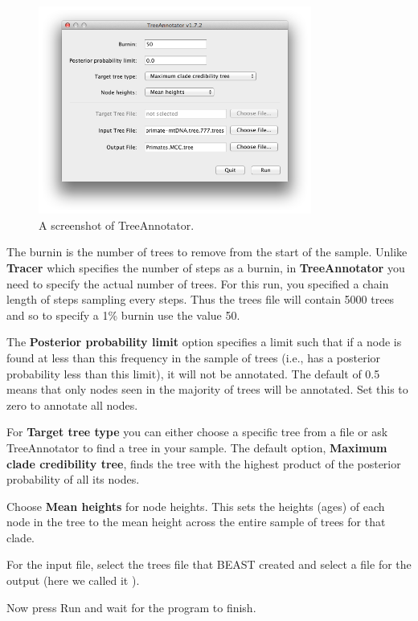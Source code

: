 \documentclass[11pt]{article}
\theoremstyle{plain}%
\theoremstyle{definition}
\theoremstyle{remark}
\begin{document}
\begin{figure}
\includegraphics[width=0.8\textwidth]{figures/TreeAnnotator1}
\caption{A screenshot of TreeAnnotator.}
\label{fig:TreeAnnotator1}
\end{figure}

The burnin is the number of trees to remove from the start of the sample. Unlike {\bf Tracer} which specifies the number of
steps as a burnin, in {\bf TreeAnnotator} you need to specify the actual number of trees. For this run, you specified a chain
length of \chainLength{} steps sampling every \logEvery{} steps. Thus the trees file will contain 5000 trees and so to specify a 1\% burnin
use the value 50.

The {\bf Posterior probability limit} option specifies a limit such that if a node is found at less than this frequency in the sample
of trees (i.e., has a posterior probability less than this limit), it will not be annotated. The default of 0.5 means that only nodes
seen in the majority of trees will be annotated. Set this to zero to annotate all nodes.

For {\bf Target tree type} you can either choose a specific tree from a file or ask TreeAnnotator to find a tree in your sample.
The default option, {\bf Maximum clade credibility tree}, finds the tree with the highest product of the posterior probability of
all its nodes.

Choose {\bf Mean heights} for node heights. This sets the heights (ages) of each node in the tree to the mean height across the
entire sample of trees for that clade.

For the input file, select the trees file that BEAST created and select a file for the
output (here we called it \mccTree{}).

Now press Run and wait for the program to finish.
\end{document}
